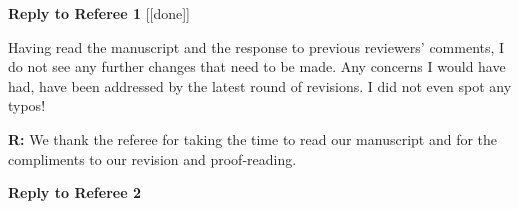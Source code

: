 \documentclass[12pt]{letter}
\newenvironment{refquote}{\bigskip \begin{it}}{\end{it}\smallskip}
\begin{document}








\clearpage

{\Large \bf Reply to Referee 1} [[done]]

	\begin{refquote}
	Having read the manuscript and the response to previous reviewers’ comments, I do not see any further changes that need to be made. Any concerns I would have had, have been addressed by the latest round of revisions. I did not even spot any typos!
	\end{refquote}

	\textbf{R:} We thank the referee for taking the time to read our manuscript and for the compliments to our revision and proof-reading.


\clearpage

{\Large \bf Reply to Referee 2}
\end{document}
